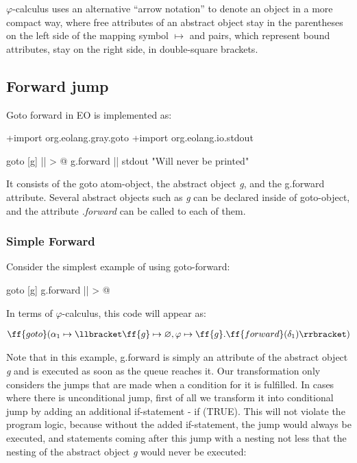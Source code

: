 \documentclass[sigplan,review,11pt,nonacm,natbib=false]{acmart}
\begin{document}
$\varphi$-calculus uses an alternative “arrow notation” to denote an object in a more compact way, where free attributes of an abstract object stay in the parentheses on the left side of the mapping symbol $\mapsto$ and pairs, which represent bound attributes, stay on the right side, in double-square brackets.


\subsection{Forward jump}
Goto forward in EO is implemented as:

\begin{ffcode}
+import org.eolang.gray.goto
+import org.eolang.io.stdout

goto
  [g]
    || > @
      g.forward ||
      stdout "Will never be printed"
\end{ffcode}

It consists of the goto atom-object, the abstract object \emph{g}, and the g.forward attribute. Several abstract objects such as \emph{g} can be declared inside of goto-object, and the attribute \emph{.forward} can be called to each of them.

\subsubsection{Simple Forward}
Consider the simplest example of using goto-forward:

\begin{ffcode}
goto
  [g]
    g.forward || > @
\end{ffcode}

In terms of $\varphi$-calculus, this code will appear as:

\begin{equation}
\begin{split}
& \ff{goto} ( \alpha_1 \mapsto \llbracket \ff{g} \mapsto \varnothing, \varphi \mapsto \ff{g}.\ff{forward} (\delta_1) \rrbracket ) \\
\end{split}
\end{equation}

Note that in this example, g.forward is simply an attribute of the abstract object \emph{g} and is executed as soon as the queue reaches it.
Our transformation only considers the jumps that are made when a condition for it is fulfilled. In cases where there is unconditional jump, first of all we transform it into conditional jump by adding an additional if-statement - if (TRUE).
This will not violate the program logic, because without the added if-statement, the jump would always be executed, and statements coming after this jump with a nesting not less that the nesting of the abstract object \emph{g} would never be executed:
\end{document}
